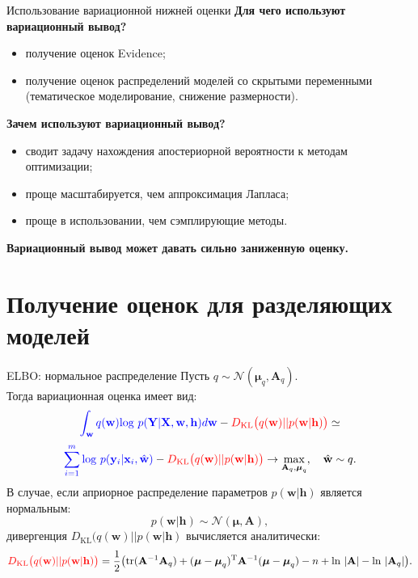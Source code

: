 \documentclass[usenames,dvipsnames,10pt,pdf,utf8,russian,aspectratio=43]{beamer}
\begin{document}
\begin{frame}{Использование вариационной нижней оценки}
\textbf{Для чего используют вариационный вывод?}
\begin{itemize}
\item получение оценок Evidence;
\item получение оценок распределений моделей со скрытыми переменными (тематическое моделирование, снижение размерности).
\end{itemize}

\textbf{Зачем используют вариационный вывод?}
\begin{itemize}
\item сводит задачу нахождения апостериорной вероятности к методам оптимизации;
\item проще масштабируется, чем аппроксимация Лапласа;
\item проще в использовании, чем сэмплирующие методы.
\end{itemize}
\textbf{Вариационный вывод может давать сильно заниженную оценку.}
\end{frame}


\section{Получение оценок для разделяющих моделей}
\begin{frame}{ELBO: нормальное распределение}
Пусть $q \sim \mathcal{N}(\boldsymbol{\mu}_q, \mathbf{A}_q).$\\
Тогда вариационная оценка имеет вид:
$$
\textcolor{blue}{\int_{\mathbf{w}} q(\mathbf{w})\text{log}~{p(\mathbf{Y}|\mathbf{X},\mathbf{w},\mathbf{h})} d \mathbf{w}} - \textcolor{red}{D_\text{KL}\bigl(q (\mathbf{w} )|| p (\mathbf{w}|\mathbf{h})\bigr)} \simeq
$$
$$
\textcolor{blue}{\sum_{i=1}^m \text{log}~p(\mathbf{y}_i|\mathbf{x}_i, \hat{\mathbf{w}})} - \textcolor{red}{D_\text{KL}\bigl(q (\mathbf{w} )|| p (\mathbf{w}|\mathbf{h})\bigr)} \to \max_{\mathbf{A}_q, \boldsymbol{\mu}_q}, \quad \hat{\mathbf{w}} \sim q.
$$
В случае, если априорное распределение параметров $p(\mathbf{w}|\mathbf{h})$ является нормальным: 
$$
p(\mathbf{w}|\mathbf{h}) \sim \mathcal{N}(\boldsymbol{\mu}, \mathbf{A}),
$$
дивергенция $D_\text{KL}\bigl(q (\mathbf{w} )|| p (\mathbf{w}|\mathbf{h})$ вычисляется аналитически:
$$
 \textcolor{red}{D_\text{KL}\bigl(q (\mathbf{w}) || p (\mathbf{w}|\mathbf{h})\bigr)} = \frac{1}{2} \bigl( \text{tr} (\mathbf{A}^{-1}\mathbf{A}_q) + (\boldsymbol{\mu} - \boldsymbol{\mu}_q)^\text{T}\mathbf{A}^{-1}(\boldsymbol{\mu} - \boldsymbol{\mu}_q) - n +\text{ln}~|\mathbf{A}| - \text{ln}~|\mathbf{A}_q| \bigr).
$$
\end{frame}
\end{document}
